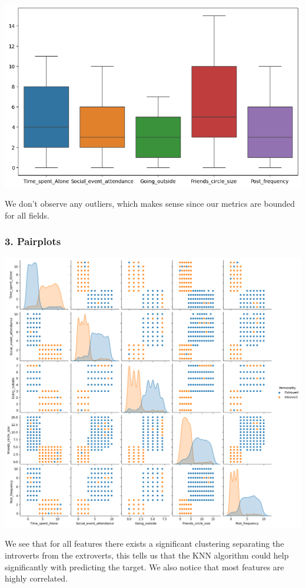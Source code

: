 \documentclass[
]{article}
\begin{document}
\includegraphics{3_2.png}

We don't observe any outliers, which makes sense since our metrics are
bounded for all fields.

\hypertarget{pairplots}{%
\subsubsection{3. Pairplots}\label{pairplots}}

\includegraphics{3_3.png}

We see that for all features there exists a significant clustering
separating the introverts from the extroverts, this tells us that the
KNN algorithm could help significantly with predicting the target. We
also notice that most features are highly correlated.
\end{document}

